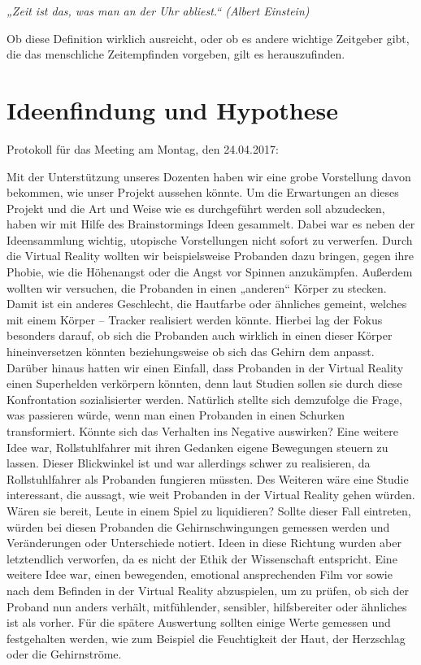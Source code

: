 \documentclass{Bericht}
\begin{document}
	\textit{„Zeit ist das, was man an der Uhr abliest.“ (Albert Einstein)}

	Ob diese Definition wirklich ausreicht, oder ob es andere wichtige Zeitgeber gibt, die das menschliche Zeitempfinden vorgeben, gilt es herauszufinden. 

\section{Ideenfindung und Hypothese} %
	Protokoll für das Meeting am Montag, den 24.04.2017:
	
	Mit der Unterstützung unseres Dozenten haben wir eine grobe Vorstellung davon bekommen, wie unser Projekt aussehen könnte. Um die Erwartungen an dieses Projekt und die Art und Weise wie es durchgeführt werden soll abzudecken, haben wir mit Hilfe des Brainstormings Ideen gesammelt. Dabei war es neben der Ideensammlung wichtig, utopische Vorstellungen nicht sofort zu verwerfen. Durch die Virtual Reality wollten wir beispielsweise Probanden dazu bringen, gegen ihre Phobie, wie die Höhenangst oder die Angst vor Spinnen anzukämpfen. Außerdem wollten wir versuchen, die Probanden in einen „anderen“ Körper zu stecken. Damit ist ein anderes Geschlecht, die Hautfarbe oder ähnliches gemeint, welches mit einem Körper – Tracker realisiert werden könnte. Hierbei lag der Fokus besonders darauf, ob sich die Probanden auch wirklich in einen dieser Körper hineinversetzen könnten beziehungsweise ob sich das Gehirn dem anpasst. Darüber hinaus hatten wir einen Einfall, dass Probanden in der Virtual Reality einen Superhelden verkörpern könnten, denn laut Studien sollen sie durch diese Konfrontation sozialisierter werden. Natürlich stellte sich demzufolge die Frage, was passieren würde, wenn man einen Probanden in einen Schurken transformiert. Könnte sich das Verhalten ins Negative auswirken? Eine weitere Idee war, Rollstuhlfahrer mit ihren Gedanken eigene Bewegungen steuern zu lassen. Dieser Blickwinkel ist und war allerdings schwer zu realisieren, da Rollstuhlfahrer als Probanden fungieren müssten. Des Weiteren wäre eine Studie interessant, die aussagt, wie weit Probanden in der Virtual Reality gehen würden. Wären sie bereit, Leute in einem Spiel zu liquidieren? Sollte dieser Fall eintreten, würden bei diesen Probanden die Gehirnschwingungen gemessen werden und Veränderungen oder Unterschiede notiert. Ideen in diese Richtung wurden aber letztendlich verworfen, da es nicht der Ethik der Wissenschaft entspricht. Eine weitere Idee war, einen bewegenden, emotional ansprechenden Film vor sowie nach dem Befinden in der Virtual Reality abzuspielen, um zu prüfen, ob sich der Proband nun anders verhält, mitfühlender, sensibler, hilfsbereiter oder ähnliches ist als vorher. Für die spätere Auswertung sollten einige Werte gemessen und festgehalten werden, wie zum Beispiel die Feuchtigkeit der Haut, der Herzschlag oder die Gehirnströme.
\end{document}
